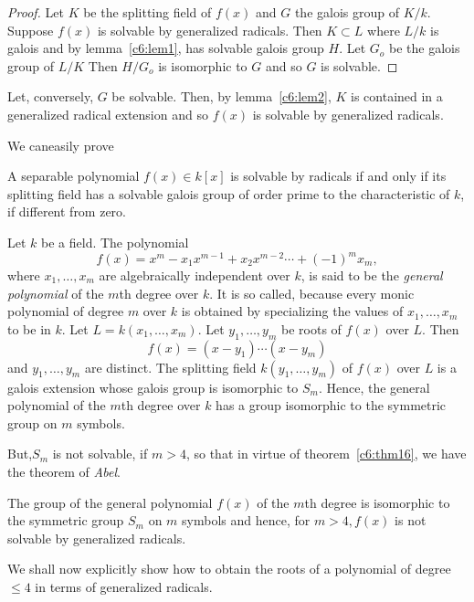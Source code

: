 \begin{proof} %
Let $K$ be the splitting field of $f(x)$ and $G$ the galois group of
$K/k$. Suppose $f(x)$ is solvable by generalized radicals. Then $K
\subset L$ where $L/k$ is galois and by lemma~\ref{c6:lem1}, has
solvable galois group $H$. Let $G_o$ be the galois group of $L/K$ Then
$H/G_o$ is isomorphic to $G$ and so $G$ is solvable.  
\end{proof} 

Let, conversely, $G$ be solvable. Then, by lemma~\ref{c6:lem2}, $K$
is contained in a generalized radical extension and so $f(x)$ is
solvable by generalized radicals.  

We can\pageoriginale easily prove 

\begin{coro*} %
A separable polynomial $f(x) \in k[x]$ is solvable by radicals if
  and only if its splitting field has a solvable galois group of order
  prime to the characteristic of $k$, if different from zero. 
\end{coro*}

Let $k$ be a field. The polynomial
$$
f(x) = x^m-x_1 x^{m-1} + x_2 x^{m-2} \cdots + (-1)^m x_m, 
$$
where $x_1, \ldots , x_m$ are algebraically independent over $k$, is
said to be the \textit{general polynomial} of the $m$th degree over
$k$. It is so called, because every monic polynomial of degree $m$
over $k$ is obtained by specializing the values of $x_1, \ldots , x_m$
to be in $k$. Let $L= k(x_1, \ldots , x_m)$. Let $y_1, \ldots , y_m$
be roots of $f(x)$ over $L$. Then 
$$
f(x) = (x-y_1) \cdots(x -y_m)
$$
and $y_1, \ldots , y_m$ are distinct. The splitting field $k(y_1,
\ldots , y_m)$ of $f(x)$ over $L$ is a galois extension whose galois
group is isomorphic to $S_m$. Hence, the general polynomial of the $m$th
degree over $k$ has a group isomorphic to the symmetric group on $m$
symbols. 

But,$S_m$ is not solvable, if $m>4$, so that in virtue of 
theorem~\ref{c6:thm16}, we have the theorem of \textit{Abel}. 

\begin{thm}\label{c6:thm17} %
 The group of the general polynomial $f(x)$ of the $m$th degree is
  isomorphic to the symmetric group $S_m$ on $m$ symbols and hence,
  for $m>4,f(x)$ is not solvable by generalized radicals. 
\end{thm}

We shall now explicitly show how to obtain the roots of a polynomial
of degree $\leq 4$ in terms of generalized radicals. 

